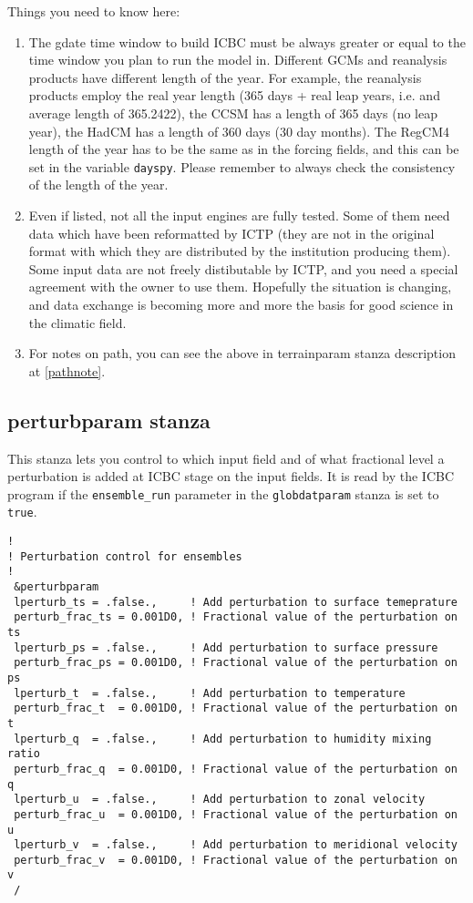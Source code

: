 Things you need to know here:

\begin{enumerate}
\item The gdate time window to build ICBC must be always greater or equal to
the time window you plan to run the model in.
Different GCMs and reanalysis products have different length of the year.
For example, the reanalysis products employ the real year length (365 days +
real leap years, i.e. and average length of 365.2422), the CCSM has a length
of 365 days (no leap year), the HadCM has a length of 360 days (30 day months).
The RegCM4 length of the year has to be the same as in the forcing fields, and
this can be set in the variable \verb=dayspy=.
Please remember to always check the consistency of the length of the year.
\item Even if listed, not all the input engines are fully tested. Some of them
need data which have been reformatted by ICTP (they are not in the original
format with which they are distributed by the institution producing them).
Some input data are not freely distibutable by ICTP, and you need a special
agreement with the owner to use them.
Hopefully the situation is changing, and data exchange is becoming more and more
the basis for good science in the climatic field.
\item For notes on path, you can see the above in terrainparam stanza
description at \ref{pathnote}.
\end{enumerate}

\subsection{perturbparam stanza}

This stanza lets you control to which input field and of what fractional
level a perturbation is added at ICBC stage on the input fields.
It is read by the ICBC program if the \verb=ensemble_run= parameter in the
\verb=globdatparam= stanza is set to \verb=true=.

{\footnotesize
\begin{Verbatim}
!
! Perturbation control for ensembles
!
 &perturbparam
 lperturb_ts = .false.,     ! Add perturbation to surface temeprature
 perturb_frac_ts = 0.001D0, ! Fractional value of the perturbation on ts
 lperturb_ps = .false.,     ! Add perturbation to surface pressure
 perturb_frac_ps = 0.001D0, ! Fractional value of the perturbation on ps
 lperturb_t  = .false.,     ! Add perturbation to temperature
 perturb_frac_t  = 0.001D0, ! Fractional value of the perturbation on t
 lperturb_q  = .false.,     ! Add perturbation to humidity mixing ratio
 perturb_frac_q  = 0.001D0, ! Fractional value of the perturbation on q
 lperturb_u  = .false.,     ! Add perturbation to zonal velocity
 perturb_frac_u  = 0.001D0, ! Fractional value of the perturbation on u
 lperturb_v  = .false.,     ! Add perturbation to meridional velocity
 perturb_frac_v  = 0.001D0, ! Fractional value of the perturbation on v
 /
\end{Verbatim}
}

